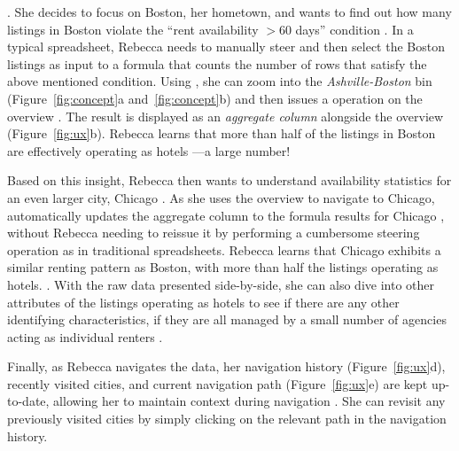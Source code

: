 .
She decides to focus on Boston, her hometown,
and wants to find out how many listings
in Boston violate
the ``rent availability $>60$ days'' condition .
In a typical spreadsheet, Rebecca needs to manually steer and then select
the Boston listings as input to a  
formula that counts the number of
rows that satisfy the above mentioned condition.
Using \noah, she can zoom into
the {\em Ashville-Boston} bin
(Figure~\ref{fig:concept}a and~\ref{fig:concept}b)
and then issues
a  operation on the overview  .
The result is displayed as an {\em aggregate column}
alongside the overview (Figure~\ref{fig:ux}b).
Rebecca learns that 
more than half of the listings in Boston are 
effectively operating as hotels ---a large number! 

Based on this insight, Rebecca then wants to
understand availability statistics for an even
larger city, Chicago .
As she uses the overview to navigate
to Chicago, \noah
automatically updates the aggregate column to
the  formula results for Chicago ,
without Rebecca needing to reissue it by performing a 
cumbersome steering operation as in traditional spreadsheets. 
Rebecca learns that Chicago exhibits 
a similar renting pattern as Boston, with more than half the listings operating as hotels. 
. 
With the raw 
data presented side-by-side, she can also dive into other attributes
of the listings operating as hotels to see if there are any other identifying characteristics,
\eg if they are all managed by a small number of agencies acting as individual renters .

 Finally, as Rebecca navigates the data,
 her navigation history (Figure~\ref{fig:ux}d),
 \ie recently visited cities, and current navigation path
 (Figure~\ref{fig:ux}e) are kept up-to-date,
 allowing her to maintain context during navigation .
 She can revisit any previously visited cities 
 by simply clicking on the relevant path
 in the navigation history.


